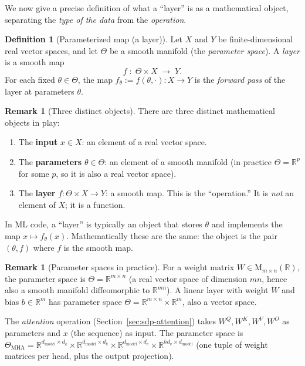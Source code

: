 \documentclass[11pt]{amsart}
\theoremstyle{plain}
\theoremstyle{definition}
\newtheorem{definition}[theorem]{Definition}
\newtheorem{remark}[theorem]{Remark}
\newcommand{\R}{\mathbb{R}}
\newcommand{\Mat}[2]{\mathrm{M}_{#1 \times #2}(\R)}
\begin{document}
We now give a precise definition of what a ``layer'' is as a mathematical
object, separating the \emph{type of the data} from the \emph{operation}.

\begin{definition}[Parameterized map (a layer)]
\label{def:layer}
Let $X$ and $Y$ be finite-dimensional real vector spaces, and let $\Theta$ be
a smooth manifold (the \emph{parameter space}).
A \emph{layer} is a smooth map
\[
    f \;:\; \Theta \times X \;\longrightarrow\; Y.
\]
For each fixed $\theta \in \Theta$, the map $f_\theta := f(\theta, \cdot) :
X \to Y$ is the \emph{forward pass} of the layer at parameters $\theta$.
\end{definition}

\begin{remark}[Three distinct objects]
There are three distinct mathematical objects in play:
\begin{enumerate}[label=(\roman*)]
    \item The \textbf{input} $x \in X$: an element of a real vector space.
    \item The \textbf{parameters} $\theta \in \Theta$: an element of a smooth manifold (in practice $\Theta = \mathbb{R}^p$ for some $p$, so it is also a real vector space).
    \item The \textbf{layer} $f : \Theta \times X \to Y$: a smooth map.  This is the ``operation.''  It is \emph{not} an element of $X$; it is a function.
\end{enumerate}
In ML code, a ``layer'' is typically an object that stores $\theta$ and
implements the map $x \mapsto f_\theta(x)$.  Mathematically these are the
same: the object is the pair $(\theta, f)$ where $f$ is the smooth map.
\end{remark}

\begin{remark}[Parameter spaces in practice]
For a weight matrix $W \in \Mat{m}{n}$, the parameter space is
$\Theta = \mathbb{R}^{m \times n}$ (a real vector space of dimension $mn$,
hence also a smooth manifold diffeomorphic to $\mathbb{R}^{mn}$).  A linear
layer with weight $W$ and bias $b \in \mathbb{R}^m$ has parameter space
$\Theta = \mathbb{R}^{m \times n} \times \mathbb{R}^m$, also a vector space.

The \emph{attention} operation (Section~\ref{sec:sdp-attention}) takes
$W^Q, W^K, W^V, W^O$ as parameters and $x$ (the sequence) as input.  The
parameter space is
$\Theta_{\mathrm{MHA}} = \mathbb{R}^{d_{\mathrm{model}} \times d_k}
\times \mathbb{R}^{d_{\mathrm{model}} \times d_k}
\times \mathbb{R}^{d_{\mathrm{model}} \times d_v}
\times \mathbb{R}^{h d_v \times d_{\mathrm{model}}}$
(one tuple of weight matrices per head, plus the output projection).
\end{remark}
\end{document}
